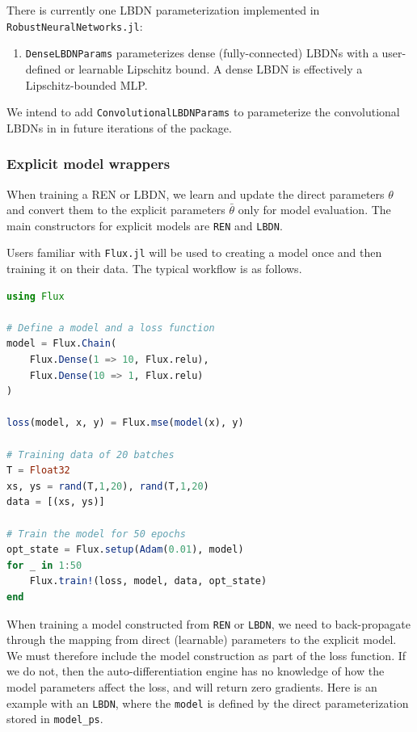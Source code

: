 There is currently one LBDN parameterization implemented in \verb|RobustNeuralNetworks.jl|:

\begin{enumerate}
    \item \verb|DenseLBDNParams| parameterizes dense (fully-connected) LBDNs with a user-defined or learnable Lipschitz bound. A dense LBDN is effectively a Lipschitz-bounded MLP.
\end{enumerate}

We intend to add \verb|ConvolutionalLBDNParams| to parameterize the convolutional LBDNs in \cite{Wang+Manchester2023} in future iterations of the package.

\subsubsection{Explicit model wrappers} \label{sec:explicit-wrappers}

When training a REN or LBDN, we learn and update the direct parameters $\theta$ and convert them to the explicit parameters $\bar{\theta}$ only for model evaluation. The main constructors for explicit models are \verb|REN| and \verb|LBDN|.

Users familiar with \verb|Flux.jl| will be used to creating a model once and then training it on their data. The typical workflow is as follows.

\begin{lstlisting}[language = Julia]
using Flux

# Define a model and a loss function
model = Flux.Chain(
    Flux.Dense(1 => 10, Flux.relu), 
    Flux.Dense(10 => 1, Flux.relu)
)

loss(model, x, y) = Flux.mse(model(x), y)

# Training data of 20 batches
T = Float32
xs, ys = rand(T,1,20), rand(T,1,20)
data = [(xs, ys)]

# Train the model for 50 epochs
opt_state = Flux.setup(Adam(0.01), model)
for _ in 1:50
    Flux.train!(loss, model, data, opt_state)
end
\end{lstlisting}

When training a model constructed from \verb|REN| or \verb|LBDN|, we need to back-propagate through the mapping from direct (learnable) parameters to the explicit model. We must therefore include the model construction as part of the loss function. If we do not, then the auto-differentiation engine has no knowledge of how the model parameters affect the loss, and will return zero gradients. Here is an example with an \verb|LBDN|, where the \verb|model| is defined by the direct parameterization stored in \verb|model_ps|.

